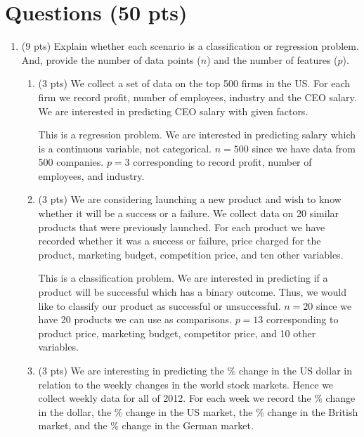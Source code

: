 \documentclass[a4paper]{article}
\theoremstyle{definition}
\newenvironment{soln}{
    \leavevmode\color{blue}\ignorespaces
}{}
\begin{document}
\section{Questions (50 pts)}
\begin{enumerate}
\item (9 pts) Explain whether each scenario is a classification or regression problem. And, provide the number of data points ($n$) and the number of features ($p$).

\begin{enumerate}
	\item (3 pts) We collect a set of data on the top 500 firms in the US. For each firm we record profit, number of employees, industry and the CEO salary. We are interested in predicting CEO salary with given factors.
	
	\begin{soln}  
		This is a regression problem. 
		We are interested in predicting salary which is a continuous variable, not categorical. 
		$n = 500$ since we have data from 500 companies. 
		$p = 3$ corresponding to record profit, number of employees, and industry. 
	\end{soln}
	
	\item (3 pts) We are considering launching a new product and wish to know whether it will be a success or a failure. We collect data on 20 similar products that were previously launched. For each product we have recorded whether it was a success or failure, price charged for the product, marketing budget, competition price, and ten other variables.
	
	\begin{soln}
		This is a classification problem.
		We are interested in predicting if a product will be successful which has a binary outcome.
		Thus, we would like to classify our product as successful or unsuccessful.
		$n = 20$ since we have 20 products we can use as comparisons.
		$p = 13$ corresponding to product price, marketing budget, competitor price, and 10 other variables.
	\end{soln}
	
	\item (3 pts) We are interesting in predicting the \% change in the US dollar in relation to the weekly changes in the world stock markets. Hence we collect weekly data for all of 2012. For each week we record the \% change in the dollar, the \% change in the US market, the \% change in the British market, and the \% change in the German market.
	

\end{enumerate}
\end{enumerate}
\end{document}
